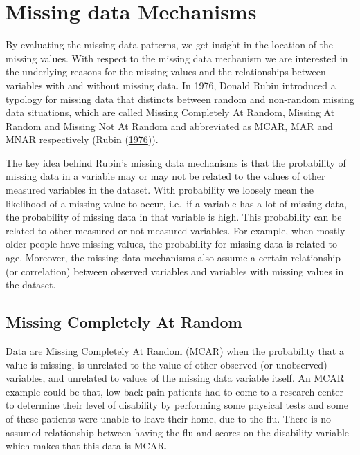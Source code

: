 \documentclass[
]{book}
\begin{document}
\hypertarget{missing-data-mechanisms}{%
\section{Missing data Mechanisms}\label{missing-data-mechanisms}}

By evaluating the missing data patterns, we get insight in the location
of the missing values. With respect to the missing data mechanism we are
interested in the underlying reasons for the missing values and the
relationships between variables with and without missing data. In 1976,
Donald Rubin introduced a typology for missing data that distincts
between random and non-random missing data situations, which are called
Missing Completely At Random, Missing At Random and Missing Not At
Random and abbreviated as MCAR, MAR and MNAR respectively (Rubin
(\protect\hyperlink{ref-Rubin1976}{1976})).

The key idea behind Rubin's missing data mechanisms is that the
probability of missing data in a variable may or may not be related to
the values of other measured variables in the dataset. With probability
we loosely mean the likelihood of a missing value to occur, i.e.~if a
variable has a lot of missing data, the probability of missing data in
that variable is high. This probability can be related to other measured
or not-measured variables. For example, when mostly older people have
missing values, the probability for missing data is related to age.
Moreover, the missing data mechanisms also assume a certain relationship
(or correlation) between observed variables and variables with missing
values in the dataset.

\hypertarget{missing-completely-at-random}{%
\subsection{Missing Completely At
Random}\label{missing-completely-at-random}}

Data are Missing Completely At Random (MCAR) when the probability that a
value is missing, is unrelated to the value of other observed (or
unobserved) variables, and unrelated to values of the missing data
variable itself. An MCAR example could be that, low back pain patients
had to come to a research center to determine their level of disability
by performing some physical tests and some of these patients were unable
to leave their home, due to the flu. There is no assumed relationship
between having the flu and scores on the disability variable which makes
that this data is MCAR.
\end{document}
